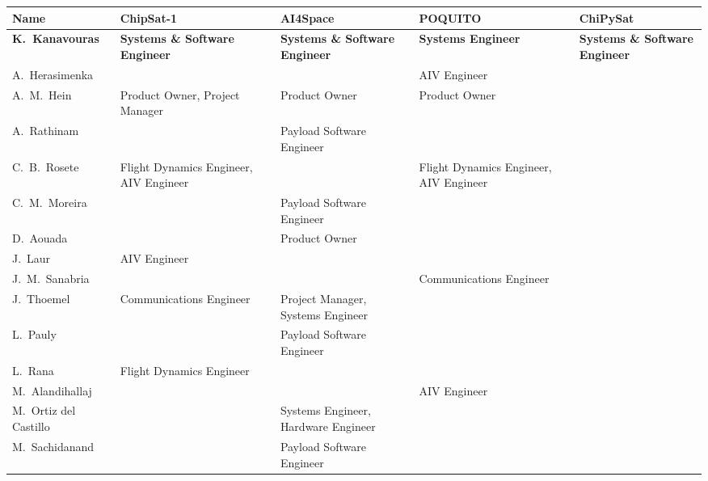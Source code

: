 \documentclass[a4paper,nobib,justified,final]{tufte-book}
\begin{document}
\begin{fullwidth}
\begin{table}[h]
	\begin{adjustbox}{width=\textwidth}
\begin{tabular}{@{}lllll@{}}
	\toprule
	\textbf{Name} & \textbf{ChipSat-1} & \textbf{AI4Space} & \textbf{POQUITO} & \textbf{ChiPySat} \\ \midrule
	\textbf{K.~Kanavouras} & \textbf{\color{Systems}Systems \& Software Engineer} & \textbf{\color{Systems}Systems \& Software Engineer} & \textbf{\color{Systems}Systems Engineer} & \textbf{\color{Systems}Systems \& Software Engineer} \\ 
	\rowcolors{2}{white}{gray!5}
	A.~Herasimenka &  &  & \textcolor{AIV}{AIV Engineer} &  \\
	A.~M.~Hein & \textcolor{ProductOwner}{Product Owner}, \textcolor{Manager}{Project Manager} & \textcolor{ProductOwner}{Product Owner} & \textcolor{ProductOwner}{Product Owner} &  \\
	A.~Rathinam &  & \textcolor{Payload}{Payload Software Engineer} &  &  \\
	C.~B.~Rosete & \textcolor{Traj}{Flight Dynamics Engineer}, \textcolor{AIV}{AIV Engineer} &  & \textcolor{Traj}{Flight Dynamics Engineer}, \textcolor{AIV}{AIV Engineer} &  \\
	C.~M.~Moreira &  & \textcolor{Payload}{Payload Software Engineer} &  &  \\
	D.~Aouada &  & \textcolor{ProductOwner}{Product Owner} &  &  \\
	J.~Laur & \textcolor{AIV}{AIV Engineer} &  &  &  \\
	J.~M.~Sanabria &  &  & \textcolor{Comms}{Communications Engineer} &  \\
	J.~Thoemel & \textcolor{Comms}{Communications Engineer} & \textcolor{Manager}{Project Manager}, \textcolor{Systems}{Systems Engineer} &  &  \\
	L.~Pauly &  & \textcolor{Payload}{Payload Software Engineer} &  &  \\
	L.~Rana & \textcolor{Payload}{Flight Dynamics Engineer} &  &  &  \\
	M.~Alandihallaj &  &  & \textcolor{AIV}{AIV Engineer} &  \\
	M.~Ortiz del Castillo &  & \textcolor{Systems}{Systems Engineer}, \textcolor{Hardware}{Hardware Engineer} &  &  \\
	M.~Sachidanand &  & \textcolor{Payload}{Payload Software Engineer} &  &  \\

\end{tabular}
\end{adjustbox}
\end{table}
\end{fullwidth}
\end{document}
